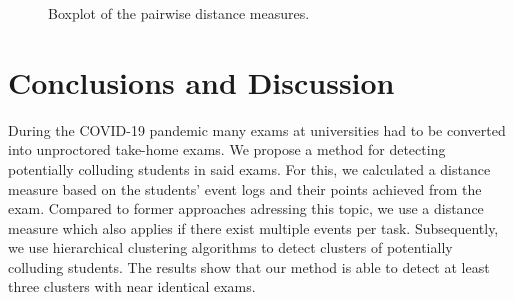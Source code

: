 \documentclass{edm_article}
\begin{document}
\begin{figure}
\begin{center}
\caption{Boxplot of the pairwise distance measures.}
\label{fig:comp_stud_boxplot}
\end{center}
\end{figure}

\section{Conclusions and Discussion}\label{sec:conclusion}

During the COVID-19 pandemic many exams at universities had to be converted into unproctored take-home exams. We propose a method for detecting potentially colluding students in said exams. For this, we calculated a distance measure based on the students' event logs and their points achieved from the exam. Compared to former approaches adressing this topic, we use a distance measure which also applies if there exist multiple events per task. Subsequently, we use hierarchical clustering algorithms to detect clusters of potentially colluding students. The results show that our method is able to detect at least three clusters with near identical exams. 
\end{document}
